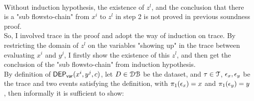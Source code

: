 \\
%
Without induction hypothesis, the existence of $z^l$, and the conclusion that there is a "sub flowsto-chain" from $x^i$ to $z^l$ in step 2 
is not proved in previous soundness proof.
\\
%
So, I involved trace in the proof and adopt the way of induction on trace.
By restricting the domain of $z^l$ on the variables "showing up" in the 
trace between evaluating $x^i$ and $y^j$, 
I firstly show the existence of this $z^l$, and then get the conclusion of the  "sub flowsto-chain" from induction hypothesis. 
\\
%
By definition of $\mathsf{DEP_{var}}(x^i, y^j, {c})$, 
let $D \in \mathcal{DB}$ be the dataset,
and $\mathtt{\tau} \in \mathcal{T}$, $\mathtt{\epsilon}_x, \mathtt{\epsilon}_y$ be the trace and two events satisfying the definition, 
with $\pi_1(\mathtt{\epsilon}_x) = x$ and $\pi_1(\mathtt{\epsilon}_y) = y$, then informally it is sufficient to show:
